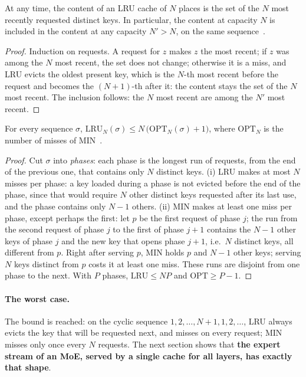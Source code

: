 \begin{proposition}\label{prop:t2o-pile}
At any time, the content of an LRU cache of $N$ places is the set of the $N$ most recently requested distinct keys. In particular, the content at capacity $N$ is included in the content at any capacity $N' > N$, on the same sequence~\cite{mattson1970}.
\end{proposition}

\begin{proof}
Induction on requests. A request for $z$ makes $z$ the most recent; if $z$ was among the $N$ most recent, the set does not change; otherwise it is a miss, and LRU evicts the oldest present key, which is the $N$-th most recent before the request and becomes the $(N{+}1)$-th after it: the content stays the set of the $N$ most recent. The inclusion follows: the $N$ most recent are among the $N'$ most recent.
\end{proof}

\begin{theoreme}\label{thm:t2o-competitif}
For every sequence $\sigma$, $\mathrm{LRU}_N(\sigma) \le N\,\big(\mathrm{OPT}_N(\sigma) + 1\big)$, where $\mathrm{OPT}_N$ is the number of misses of MIN~\cite{sleator1985}.
\end{theoreme}

\begin{proof}
Cut $\sigma$ into \emph{phases}: each phase is the longest run of requests, from the end of the previous one, that contains only $N$ distinct keys. (i) LRU makes at most $N$ misses per phase: a key loaded during a phase is not evicted before the end of the phase, since that would require $N$ other distinct keys requested after its last use, and the phase contains only $N - 1$ others. (ii) MIN makes at least one miss per phase, except perhaps the first: let $p$ be the first request of phase $j$; the run from the second request of phase $j$ to the first of phase $j+1$ contains the $N - 1$ other keys of phase $j$ and the new key that opens phase $j+1$, i.e.\ $N$ distinct keys, all different from $p$. Right after serving $p$, MIN holds $p$ and $N - 1$ other keys; serving $N$ keys distinct from $p$ costs it at least one miss. These runs are disjoint from one phase to the next. With $P$ phases, $\mathrm{LRU} \le N P$ and $\mathrm{OPT} \ge P - 1$.
\end{proof}

\paragraph{The worst case.} The bound is reached: on the cyclic sequence $1, 2, \ldots, N+1, 1, 2, \ldots$, LRU always evicts the key that will be requested next, and misses on every request; MIN misses only once every $N$ requests. The next section shows that \textbf{the expert stream of an MoE, served by a single cache for all layers, has exactly that shape}.

